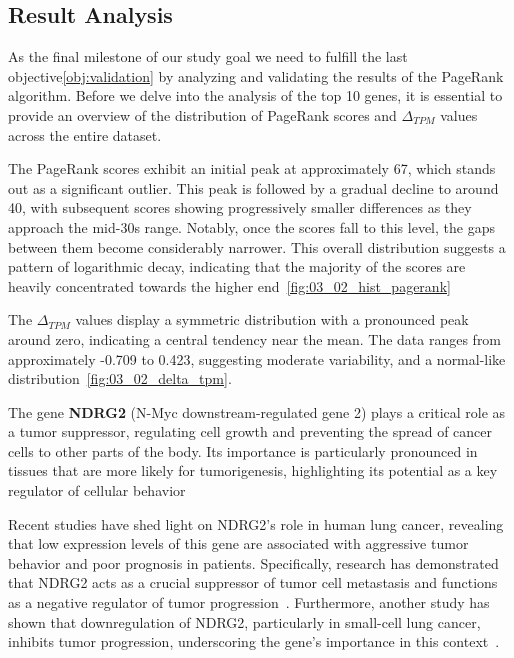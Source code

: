 \subsection{Result Analysis} \label{subsec:result_analysis}

As the final milestone of our study goal we need to fulfill the last objective\cref{obj:validation} by analyzing and
validating the results of the PageRank algorithm.
Before we delve into the analysis of the top 10 genes,
it is essential to provide an overview of the distribution of PageRank scores and $\Delta_{TPM}$ values across the entire dataset.

The PageRank scores exhibit an initial peak at approximately 67, which stands out as a significant outlier.
This peak is followed by a gradual decline to around 40, with subsequent scores showing progressively smaller differences
as they approach the mid-30s range.
Notably, once the scores fall to this level, the gaps between them become considerably narrower.
This overall distribution suggests a pattern of logarithmic decay,
indicating that the majority of the scores are heavily concentrated towards the higher end~\cref{fig:03_02_hist_pagerank}

The $\Delta_{TPM}$ values display a symmetric distribution with a pronounced peak around zero, indicating a central tendency near the mean.
The data ranges from approximately -0.709 to 0.423, suggesting moderate variability, and a normal-like distribution~\cref{fig:03_02_delta_tpm}.
\newline


The gene \textbf{NDRG2} (N-Myc downstream-regulated gene 2) plays a critical role as a tumor suppressor,
regulating cell growth and preventing the spread of cancer cells to other parts of the body.
Its importance is particularly pronounced in tissues that are more likely for tumorigenesis,
highlighting its potential as a key regulator of cellular behavior~\cite{Lee2022NDRG2}

Recent studies have shed light on NDRG2's role in human lung cancer,
revealing that low expression levels of this gene are associated with aggressive tumor behavior and poor prognosis in patients.
Specifically, research has demonstrated that NDRG2 acts as a crucial suppressor of tumor cell metastasis and
functions as a negative regulator of tumor progression~\cite{Li2013NDRG2}.
Furthermore, another study has shown that downregulation of NDRG2, particularly in small-cell lung cancer,
inhibits tumor progression, underscoring the gene's importance in this context~\cite{Ma2024NDRG2}.

